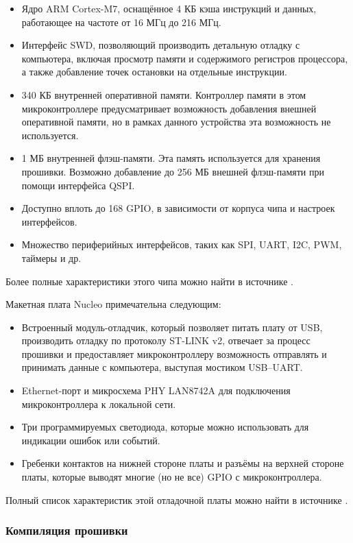 \documentclass[rusmathsym, eqnumwithinsec, amspack, hyperref]{bomgost}
\begin{document}
\begin{itemize}
	\item Ядро ARM Cortex-M7, оснащённое 4 КБ кэша инструкций и данных, работающее на частоте от 16 МГц до 216 МГц.
	\item Интерфейс SWD, позволяющий производить детальную отладку с компьютера, включая просмотр памяти и содержимого регистров процессора, а также добавление точек остановки на отдельные инструкции.
	\item 340 КБ внутренней оперативной памяти. Контроллер памяти в этом микроконтроллере предусматривает возможность добавления внешней оперативной памяти, но в рамках данного устройства эта возможность не используется.
	\item 1 МБ внутренней флэш-памяти. Эта память используется для хранения прошивки. Возможно добавление до 256 МБ внешней флэш-памяти при помощи интерфейса QSPI.
	\item Доступно вплоть до 168 GPIO, в зависимости от корпуса чипа и настроек интерфейсов.
	\item Множество периферийных интерфейсов, таких как SPI, UART, I2C, PWM, таймеры и др.
\end{itemize}

Более полные характеристики этого чипа можно найти в источнике \cite{STM32F746Datasheet}.

Макетная плата Nucleo примечательна следующим:

\begin{itemize}
	\item Встроенный модуль-отладчик, который позволяет питать плату от USB, производить отладку по протоколу ST-LINK v2, отвечает за процесс прошивки и предоставляет микроконтроллеру возможность отправлять и принимать данные с компьютера, выступая мостиком USB--UART.
	\item Ethernet-порт и микросхема PHY LAN8742A для подключения микроконтроллера к локальной сети.
	\item Три программируемых светодиода, которые можно использовать для индикации ошибок или событий.
	\item Гребенки контактов на нижней стороне платы и разъёмы на верхней стороне платы, которые выводят многие (но не все) GPIO с микроконтроллера.
\end{itemize}

Полный список характеристик этой отладочной платы можно найти в источнике \cite{NucleoDatasheet}.

\subsubsection{Компиляция прошивки}
\end{document}
